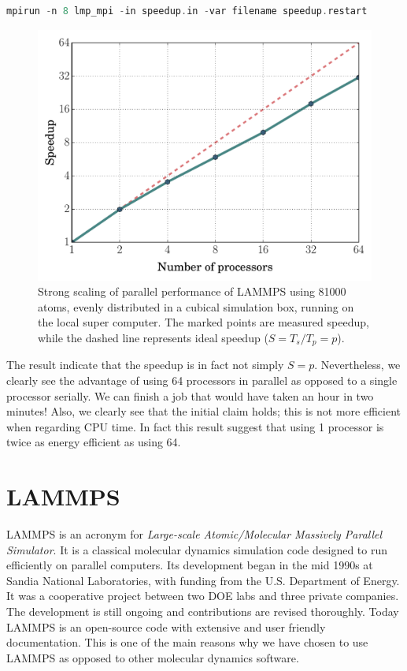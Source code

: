 \documentclass[twoside,english]{uiofysmaster}
\begin{document}
\begin{lstlisting}[caption={Command used to execute the input script speedup.in on 8 parallel processors and set the filename variable to speedup.restart.}, label={speeduprun}, language=c++]
mpirun -n 8 lmp_mpi -in speedup.in -var filename speedup.restart
\end{lstlisting}
\begin{figure}[H]
	\centering
	\includegraphics[width=0.7\linewidth]{figures/speedup/15x15_bigFonts.pdf}
	\caption{Strong scaling of parallel performance of LAMMPS using 81000 atoms, evenly distributed in a cubical simulation box, running on the local super computer. The marked points are measured speedup, while the dashed line represents ideal speedup ($S = T_s/T_p = p$). }
	\label{fig:speedup15x15}
\end{figure}
The result indicate that the speedup is in fact not simply $S=p$. 
Nevertheless, we clearly see the advantage of using 64 processors in parallel as opposed to a single processor serially. 
We can finish a job that would have taken an hour in two minutes!
Also, we clearly see that the initial claim holds; this is not more efficient when regarding CPU time. 
In fact this result suggest that using 1 processor is twice as energy efficient as using 64. 




\chapter{LAMMPS}

LAMMPS is an acronym for \textit{Large-scale Atomic/Molecular Massively Parallel Simulator}. 
It is a classical molecular dynamics simulation code designed to run efficiently on parallel computers. 
Its development began in the mid 1990s at Sandia National Laboratories, with funding from the U.S. Department of Energy. 
It was a cooperative project between two DOE labs and three private companies. 
The development is still ongoing and contributions are revised thoroughly. 
Today LAMMPS is an open-source code with extensive and user friendly documentation. 
This is one of the main reasons why we have chosen to use LAMMPS as opposed to other molecular dynamics software. 
\end{document}
